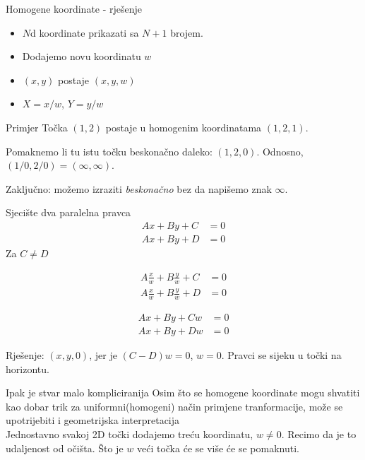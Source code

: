 \documentclass[9pt]{beamer}
\begin{document}
\begin{frame}{Homogene koordinate - rješenje}
	\begin{itemize}
		\item $N$d koordinate prikazati sa $N+1$ brojem.
		\item Dodajemo novu koordinatu $w$
		\item $(x,y)$ postaje $(x,y,w)$
		\item $X = x/w$, $Y = y/w$
	\end{itemize}
	\begin{block}{Primjer}
		Točka $(1, 2)$ postaje u homogenim koordinatama $(1, 2, 1)$.
		
		Pomaknemo li tu istu točku beskonačno daleko: $(1, 2, 0)$. Odnosno, $(1/0, 2/0) = (\infty, \infty)$.
		
		Zaključno: možemo izraziti \textit{beskonačno} bez da napišemo znak $\infty$.
	\end{block}
\end{frame}

\begin{frame}{Sjecište dva paralelna pravca}
	\begin{align*}
		Ax + By + C &= 0 \\
		Ax + By + D &= 0
	\end{align*}
	Za $C \neq D$
	
	\begin{align*}
	A\frac{x}{w} + B\frac{y}{w} + C &= 0 \\
	A\frac{x}{w} + B\frac{y}{w} + D &= 0
	\end{align*}
	
	\begin{align*}
	Ax + By + Cw &= 0 \\
	Ax + By + Dw &= 0
	\end{align*}
	
	Rješenje: $(x, y, 0)$, jer je $(C-D)w=0$, $w=0$. Pravci se sijeku u točki na horizontu.
\end{frame}
\begin{frame}{Ipak je stvar malo kompliciranija}
	Osim što se homogene koordinate mogu shvatiti kao dobar trik za uniformni(homogeni) način primjene tranformacije, može se upotrijebiti i geometrijska interpretacija
	\\
	Jednostavno svakoj 2D točki dodajemo treću koordinatu, $w \neq 0$. Recimo da je to udaljenost od očišta.  Što je $w$ veći točka će se više će se pomaknuti.
\end{frame}
\end{document}
